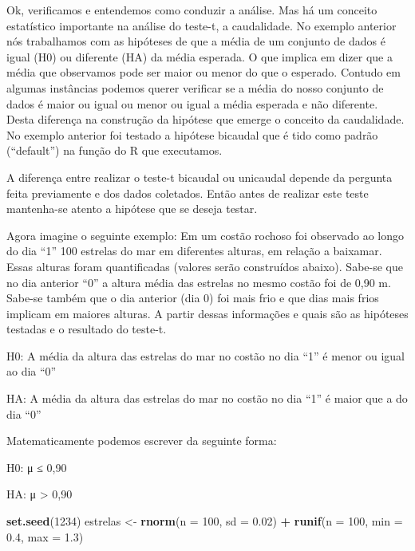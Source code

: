 \documentclass[]{book}
\newenvironment{Shaded}{\begin{snugshade}}{\end{snugshade}}
\newcommand{\DataTypeTok}[1]{\textcolor[rgb]{0.13,0.29,0.53}{#1}}
\newcommand{\DecValTok}[1]{\textcolor[rgb]{0.00,0.00,0.81}{#1}}
\newcommand{\FloatTok}[1]{\textcolor[rgb]{0.00,0.00,0.81}{#1}}
\newcommand{\KeywordTok}[1]{\textcolor[rgb]{0.13,0.29,0.53}{\textbf{#1}}}
\newcommand{\NormalTok}[1]{#1}
\newcommand{\OperatorTok}[1]{\textcolor[rgb]{0.81,0.36,0.00}{\textbf{#1}}}
\newcommand{\StringTok}[1]{\textcolor[rgb]{0.31,0.60,0.02}{#1}}
\begin{document}
Ok, verificamos e entendemos como conduzir a análise. Mas há um conceito estatístico importante na análise do teste-t, a caudalidade. No exemplo anterior nós trabalhamos com as hipóteses de que a média de um conjunto de dados é igual (H0) ou diferente (HA) da média esperada. O que implica em dizer que a média que observamos pode ser maior ou menor do que o esperado. Contudo em algumas instâncias podemos querer verificar se a média do nosso conjunto de dados é maior ou igual ou menor ou igual a média esperada e não diferente. Desta diferença na construção da hipótese que emerge o conceito da caudalidade. No exemplo anterior foi testado a hipótese bicaudal que é tido como padrão (``default'') na função do R que executamos.

A diferença entre realizar o teste-t bicaudal ou unicaudal depende da pergunta feita previamente e dos dados coletados. Então antes de realizar este teste mantenha-se atento a hipótese que se deseja testar.

Agora imagine o seguinte exemplo: Em um costão rochoso foi observado ao longo do dia ``1'' 100 estrelas do mar em diferentes alturas, em relação a baixamar. Essas alturas foram quantificadas (valores serão construídos abaixo). Sabe-se que no dia anterior ``0'' a altura média das estrelas no mesmo costão foi de 0,90 m. Sabe-se também que o dia anterior (dia 0) foi mais frio e que dias mais frios implicam em maiores alturas. A partir dessas informações e quais são as hipóteses testadas e o resultado do teste-t.

H0: A média da altura das estrelas do mar no costão no dia ``1'' é menor ou igual ao dia ``0''

HA: A média da altura das estrelas do mar no costão no dia ``1'' é maior que a do dia ``0''

Matematicamente podemos escrever da seguinte forma:

H0: μ ≤ 0,90

HA: μ \textgreater{} 0,90

\begin{Shaded}
\begin{Highlighting}[]
\KeywordTok{set.seed}\NormalTok{(}\DecValTok{1234}\NormalTok{)}
\NormalTok{estrelas <-}\StringTok{ }\KeywordTok{rnorm}\NormalTok{(}\DataTypeTok{n =} \DecValTok{100}\NormalTok{, }\DataTypeTok{sd =} \FloatTok{0.02}\NormalTok{) }\OperatorTok{+}\StringTok{ }\KeywordTok{runif}\NormalTok{(}\DataTypeTok{n =} \DecValTok{100}\NormalTok{, }\DataTypeTok{min =} \FloatTok{0.4}\NormalTok{, }\DataTypeTok{max =} \FloatTok{1.3}\NormalTok{)}
\end{Highlighting}
\end{Shaded}
\end{document}

